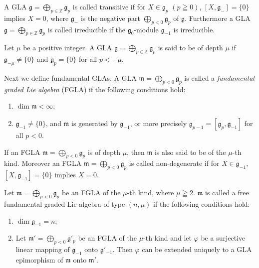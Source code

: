 \documentclass[11pt]{article}
\numberwithin{equation}{section}
\numberwithin{theorem}{section}
\numberwithin{proposition}{section}
\numberwithin{lemma}{section}
\numberwithin{corollary}{section}
\numberwithin{definition}{section}
\numberwithin{example}{section}
\numberwithin{remark}{section}
\numberwithin{note}{section}
\newcommand{\gla}[1]{\mathfrak#1=\bigoplus\limits_{p\in\mathbb Z}\mathfrak#1_p} \renewcommand{\labelenumi}{{\rm (\arabic{enumi})}}
\begin{document}
A GLA $\gla g$ is called transitive if
for $X\in\mathfrak g_p$ $(p\geqq0)$, $[X,\mathfrak g_-]=\{0\}$ implies $X=0$,
where $\mathfrak g_-$ is the negative part
$\bigoplus\limits_{p<0}\mathfrak g_p$ of $\mathfrak g$.
Furthermore a GLA $\gla g$ is called irreducible if
the $\mathfrak g_0$-module $\mathfrak g_{-1}$ is irreducible.

Let $\mu$ be a positive integer. A GLA
$\gla g$ is said to be of depth $\mu$ if $\mathfrak g_{-\mu}\ne\{0\}$ and
$\mathfrak g_p=\{0\}$ for all $p<-\mu$.

Next we def\/ine fundamental GLAs.
A GLA $\mathfrak m=\bigoplus\limits_{p<0}\mathfrak g_p$ is
called a \textit{fundamental graded Lie algebra} (FGLA)
if the following conditions hold:
\begin{enumerate}\itemsep=0pt
\renewcommand{\labelenumi}{$(\roman{enumi})$}
\item $\dim \mathfrak m<\infty$;
\item $\mathfrak g_{-1}\ne\{0\}$, and $\mathfrak m$ is generated by $\mathfrak g_{-1}$,
or more precisely $\mathfrak g_{p-1}=[\mathfrak g_p,\mathfrak g_{-1}]$
for all $p<0$.
\end{enumerate}
If an FGLA $\mathfrak m=\bigoplus\limits_{p<0}\mathfrak g_p$
is of depth $\mu$, then $\mathfrak m$
is also said to be of the $\mu$-th kind.
Moreover an FGLA $\mathfrak m=\bigoplus\limits_{p<0}\mathfrak g_p$ is called non-degenerate if
for $X\in\mathfrak g_{-1}$, $[X,\mathfrak g_{-1}]=\{0\}$ implies $X=0$.
\par
Let $\mathfrak m=\bigoplus\limits_{p<0}\mathfrak g_p$ be an FGLA of
the $\mu$-th kind, where $\mu\geqq2$. $\mathfrak m$ is called a free
fundamental graded Lie algebra of type $(n,\mu)$
if the following conditions hold:
\begin{enumerate}\itemsep=0pt
\renewcommand{\labelenumi}{$(\roman{enumi})$}
\item $\dim \mathfrak g_{-1}=n$;
\item Let $\mathfrak m'=\bigoplus\limits_{p<0}\mathfrak g'_p$ be an FGLA
of the $\mu$-th kind and let $\varphi$ be a surjective linear
mapping of $\mathfrak g_{-1}$ onto $\mathfrak g'_{-1}$.
Then $\varphi$ can be extended uniquely to a GLA
epimorphism of $\mathfrak m$ onto $\mathfrak m'$.
\end{enumerate}
\end{document}
